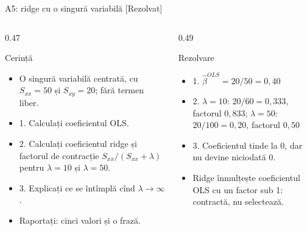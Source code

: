 \begin{frame}{A5: ridge cu o singură variabilă [Rezolvat]}
\itemsize{\scriptsize}
\begin{columns}[T]
\begin{column}{0.47\textwidth}
\begin{block}{Cerință}
\begin{itemize}
    \item O singură variabilă centrată, cu $S_{xx} = 50$ și $S_{xy} = 20$; fără termen liber.
    \item 1. Calculați coeficientul OLS.
    \item 2. Calculați coeficientul ridge și factorul de contracție $S_{xx}/(S_{xx} + \lambda)$ pentru $\lambda = 10$ și $\lambda = 50$.
    \item 3. Explicați ce se întîmplă cînd $\lambda \to \infty$.
    \item Raportați: cinci valori și o frază.
\end{itemize}
\end{block}
\end{column}
\begin{column}{0.49\textwidth}
\begin{exampleblock}{Rezolvare}
\begin{itemize}
    \item 1. $\hat\beta^{OLS} = 20/50 = 0{,}40$
    \item 2. $\lambda = 10$: $20/60 = 0{,}333$, factorul $0{,}833$; $\lambda = 50$: $20/100 = 0{,}20$, factorul $0{,}50$
    \item 3. Coeficientul tinde la 0, dar nu devine niciodată 0.
    \item Ridge înmulțește coeficientul OLS cu un factor sub 1: contractă, nu selectează.
\end{itemize}
\end{exampleblock}
\end{column}
\end{columns}
\end{frame}

